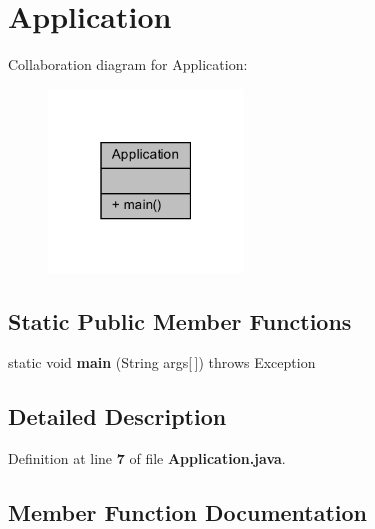 \section{Application}
\label{classch_1_1bfh_1_1gr33nopo55um_1_1enocean_1_1application_1_1Application}


Collaboration diagram for Application\+:\nopagebreak
\begin{figure}[H]
\begin{center}
\leavevmode
\includegraphics[width=147pt]{d2/d6b/classch_1_1bfh_1_1gr33nopo55um_1_1enocean_1_1application_1_1Application__coll__graph}
\end{center}
\end{figure}
\subsection*{Static Public Member Functions}
\begin{DoxyCompactItemize}
\item 
static void {\bf main} (String args[$\,$])  throws Exception 
\end{DoxyCompactItemize}


\subsection{Detailed Description}


Definition at line {\bf 7} of file {\bf Application.\+java}.



\subsection{Member Function Documentation}
\label{classch_1_1bfh_1_1gr33nopo55um_1_1enocean_1_1application_1_1Application_a75988cf84fc6ee7a2ebff36e363021aa} 
